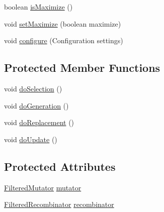\begin{DoxyCompactItemize}
\item 
boolean \hyperlink{classnet_1_1sf_1_1jclec_1_1algorithm_1_1multiobjective_1_1_n_s_g_a2_aea8cab2bf17174b0cbb65a28b5b490ed}{is\-Maximize} ()
\item 
void \hyperlink{classnet_1_1sf_1_1jclec_1_1algorithm_1_1multiobjective_1_1_n_s_g_a2_a43bb0f5af0102e3c51a5d333e368c476}{set\-Maximize} (boolean maximize)
\item 
void \hyperlink{classnet_1_1sf_1_1jclec_1_1algorithm_1_1multiobjective_1_1_n_s_g_a2_a738a1398bb7af645e9cd0cafae48b9ad}{configure} (Configuration settings)
\end{DoxyCompactItemize}
\subsection*{Protected Member Functions}
\begin{DoxyCompactItemize}
\item 
void \hyperlink{classnet_1_1sf_1_1jclec_1_1algorithm_1_1multiobjective_1_1_n_s_g_a2_aeebee6b9ea6330ffe075acaed66a55e3}{do\-Selection} ()
\item 
void \hyperlink{classnet_1_1sf_1_1jclec_1_1algorithm_1_1multiobjective_1_1_n_s_g_a2_abf0b7bce71a07e2b820ecfc753096edb}{do\-Generation} ()
\item 
void \hyperlink{classnet_1_1sf_1_1jclec_1_1algorithm_1_1multiobjective_1_1_n_s_g_a2_a0b2da39afb80f4719726ebdc94333a32}{do\-Replacement} ()
\item 
void \hyperlink{classnet_1_1sf_1_1jclec_1_1algorithm_1_1multiobjective_1_1_n_s_g_a2_ada353b33d6391d4a75b10dec508092b6}{do\-Update} ()
\end{DoxyCompactItemize}
\subsection*{Protected Attributes}
\begin{DoxyCompactItemize}
\item 
\hyperlink{classnet_1_1sf_1_1jclec_1_1base_1_1_filtered_mutator}{Filtered\-Mutator} \hyperlink{classnet_1_1sf_1_1jclec_1_1algorithm_1_1multiobjective_1_1_n_s_g_a2_a1823d623a933ef194564311b162e7fbd}{mutator}
\item 
\hyperlink{classnet_1_1sf_1_1jclec_1_1base_1_1_filtered_recombinator}{Filtered\-Recombinator} \hyperlink{classnet_1_1sf_1_1jclec_1_1algorithm_1_1multiobjective_1_1_n_s_g_a2_a54d8a587946b6b3f1c11a348a25d85a9}{recombinator}
\end{DoxyCompactItemize}


